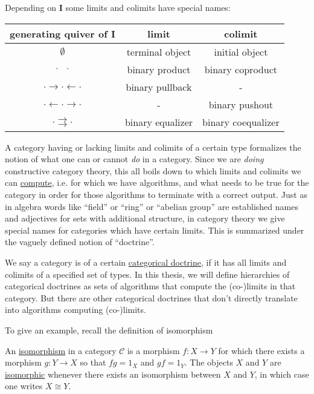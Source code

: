 \begin{example}\label{ex:limits}
Depending on \textbf{I} some limits and colimits have special names:
\begin{center}
\begin{tabular}{c|c|c}
generating quiver of $\mathbf{I}$ & limit & colimit \\
\hline
$\emptyset$ & terminal object & initial object \\
$\cdot \text{\phantom{$\rightarrow$}} \cdot$ & binary product & binary coproduct \\
$\cdot \rightarrow \cdot \leftarrow \cdot$ & binary pullback & - \\
$\cdot \leftarrow \cdot \rightarrow \cdot$  & - & binary pushout \\
$ \cdot \rightrightarrows \cdot$ & binary equalizer & binary coequalizer
\end{tabular}
\end{center}
\end{example}

A category having or lacking limits and colimits of a certain type formalizes the notion of what one can or cannot \textit{do} in a category.
Since we are \textit{doing} constructive category theory, this all boils down to which limits and colimits we can \ul{compute}, i.e. for which we
have algorithms, and what needs to be true for the category in order for those algorithms to terminate with a correct output.
Just as in algebra words like ``field'' or ``ring'' or ``abelian group'' are established names and adjectives for sets with additional structure,
in category theory we give special names for categories which have certain limits. This is summarized under the vaguely defined
notion of ``doctrine''.

\begin{definition}
We say a category is of a certain \ul{categorical doctrine}, if it has all limits and colimits of a specified set of types.
In this thesis, we will define hierarchies of categorical doctrines as sets of algorithms that compute the (co-)limits in that category.
But there are other categorical doctrines that don't directly translate into algorithms computing (co-)limits.
\end{definition}

To give an example, recall the definition of isomorphism

\begin{definition}[Isomorphism]
An \ul{isomorphism} in a category $\mathcal{C}$ is a morphism $f : X \rightarrow Y$ for which there exists a morphism
$g : Y \rightarrow X$ so that $fg = 1_{X}$ and $gf = 1_{Y}$. The objects $X$ and $Y$ are \ul{isomorphic} whenever there
exists an isomorphism between $X$ and $Y$, in which case one writes $X \cong Y$.
\end{definition}

